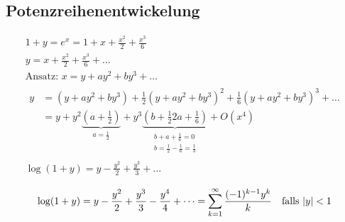 \subsection{Potenzreihenentwickelung}
\begin{gather*}
	1 + y = e^x = 1 + x + \frac{x^2}{2} + \frac{x^3}{6} \\
	y = x + \frac{x^2}{2} + \frac{x^3}{6} + \dots \\
	\text{Ansatz: } x = y + ay^2 + by^3 + \dots \\
	\begin{split}
		y	&= (y + ay^2 + by^3) + \frac{1}{2} (y + ay^2 + by^3)^2 + \frac{1}{6} (y + ay^2 + by^3)^3 + \dots \\
			&= y + y^2 \underbrace{\left( a + \frac{1}{2} \right)}_{a = \frac{1}{2}} + y^3 \underbrace{\left( b + \frac{1}{2} 2a + \frac{1}{6} \right)}_{\substack{b + a + \frac{1}{6} = 0 \\ b = \frac{1}{2} - \frac{1}{6} = \frac{1}{3}}} + O(x^4)
	\end{split} \\
	\log(1+y) = y - \frac{y^2}{2} + \frac{y^3}{3} + \dots
\end{gather*}
\begin{fakt}
	\[ \log(1+y) = y - \frac{y^2}{2} + \frac{y^3}{3} - \frac{y^4}{4} + \dots = \sum_{k=1}^\infty \frac{ (-1)^{k-1} y^k}{k} \quad \text{falls } \abs{y} < 1 \]
\end{fakt}

